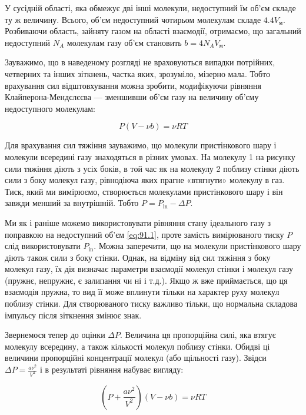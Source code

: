 \documentclass{article}
\begin{document}
У сусідній області, яка обмежує дві інші молекули, недоступний їм об'єм складе ту ж величину. Всього,
об'єм недоступний чотирьом молекулам складе $4.4V_{м}$. Розбиваючи область, зайняту газом на області
взаємодії, отримаємо, що загальний недоступний $N_A$ молекулам газу об'єм становить $b = 4N_A V_{м}$.

Зауважимо, що в наведеному розгляді не враховуються випадки потрійних, четверних та інших зіткнень,
частка яких, зрозуміло, мізерно мала. Тобто врахування сил відштовхування можна зробити, модифікуючи
рівняння Клайперона-Мендєлєєва — зменшивши об'єм газу на величину об'єму недоступного молекулам:

\begin{equation}
P(V - \nu b) = \nu RT
\label{eq:91.1}
\end{equation}

Для врахування сил тяжіння зауважимо, що молекули пристінкового шару і молекули всередині газу
знаходяться в різних умовах. На молекулу 1 на рисунку сили тяжіння діють з усіх боків, в той час як на
молекулу 2 поблизу стінки діють сили з боку молекул газу, рівнодіюча яких прагне «втягнути» молекулу в
газ. Тиск, який ми вимірюємо, створюється молекулами пристінкового шару і він завжди менший за
внутрішній. Тобто $P = P_{\text{in}} - \Delta P$.

Ми як і раніше можемо використовувати рівняння стану ідеального газу з поправкою на недоступний об'єм
\eqref{eq:91.1}, проте замість вимірюваного тиску $P$ слід використовувати $P_{\text{in}}$. Можна
заперечити, що на молекули пристінкового шару діють також сили з боку стінки. Однак, на відміну від
сил тяжіння з боку молекул газу, їх дія визначає параметри взаємодії молекул стінки і молекул газу
(пружнє, непружнє, є залипання чи ні і т.д.). Якщо ж вже приймається, що ця взаємодія пружна, то вид
її може вплинути тільки на характер руху молекул поблизу стінки. Для створюваного тиску важливо
тільки, що нормальна складова імпульсу після зіткнення змінює знак.

Звернемося тепер до оцінки $\Delta P$. Величина ця пропорційна силі, яка втягує молекулу всередину, а
також кількості молекул поблизу стінки. Обидві ці величини пропорційні концентрації молекул (або
щільності газу). Звідси $\Delta P = \frac{a\nu^2}{V^2}$ і в результаті рівняння набуває вигляду:

\begin{equation}
\left( P + \frac{a\nu^{2}}{V^{2}} \right)(V - \nu b) = \nu RT
\label{eq:91.2}
\end{equation}
\end{document}
